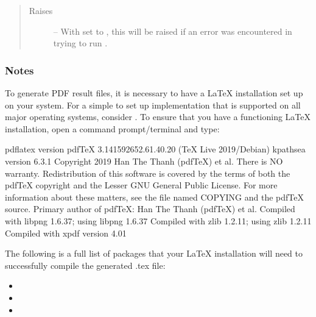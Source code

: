 \documentclass[letterpaper,10pt,english]{sphinxmanual}
\begin{document}
\begin{fulllineitems}
\begin{quote}
\begin{description}
\item[{Raises}] \leavevmode
\sphinxAtStartPar
{\hyperref[\detokenize{references/errors:nmrespy._errors.LaTeXFailedError}]{}} – With  set to , this will be raised if an error
    was encountered in trying to run .

\end{description}\end{quote}
\subsubsection*{Notes}

\sphinxAtStartPar
To generate PDF result files, it is necessary to have a LaTeX installation
set up on your system.
For a simple to set up implementation that is supported on all
major operating systems, consider
. To ensure that
you have a functioning LaTeX installation, open a command
prompt/terminal and type:

\begin{sphinxVerbatim}[commandchars=\\\{\}]
\PYGZdl{} pdflatex \PYGZhy{}version
pdfTeX 3.14159265\PYGZhy{}2.6\PYGZhy{}1.40.20 (TeX Live 2019/Debian)
kpathsea version 6.3.1
Copyright 2019 Han The Thanh (pdfTeX) et al.
There is NO warranty.  Redistribution of this software is
covered by the terms of both the pdfTeX copyright and
the Lesser GNU General Public License.
For more information about these matters, see the file
named COPYING and the pdfTeX source.
Primary author of pdfTeX: Han The Thanh (pdfTeX) et al.
Compiled with libpng 1.6.37; using libpng 1.6.37
Compiled with zlib 1.2.11; using zlib 1.2.11
Compiled with xpdf version 4.01
\end{sphinxVerbatim}

\sphinxAtStartPar
The following is a full list of packages that your LaTeX installation
will need to successfully compile the generated .tex file:
\begin{itemize}
\item {} 
\sphinxAtStartPar
{}

\item {} 
\sphinxAtStartPar
{}

\item {} 
\sphinxAtStartPar
{}


\end{itemize}
\end{fulllineitems}
\end{document}
